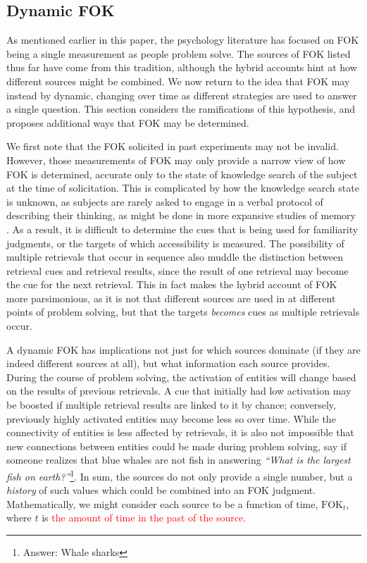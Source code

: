 \documentclass[10pt,letterpaper]{article}
\newcommand{\fixme}[2][]{#2}
\renewcommand{\fixme}[2][]{\textcolor{red}{#2}}
\newcommand{\fok}[0]{\text{FOK}}
\newcommand{\question}[2]{\emph{``#1''}\footnote{Answer: #2}}
\begin{document}


\subsection{Dynamic FOK}

As mentioned earlier in this paper, the psychology literature has focused on FOK being a single measurement as people problem solve.
The sources of FOK listed thus far have come from this tradition, although the hybrid accounts hint at how different sources might be combined. 
We now return to the idea that FOK may instead by dynamic, changing over time as different strategies are used to answer a single question.
This section considers the ramifications of this hypothesis, and proposes additional ways that FOK may be determined.

We first note that the FOK solicited in past experiments may not be invalid.
However, those measurements of FOK may only provide a narrow view of how FOK is determined, accurate only to the state of knowledge search of the subject at the time of solicitation.
This is complicated by how the knowledge search state is unknown, as subjects are rarely asked to engage in a verbal protocol of describing their thinking, as might be done in more expansive studies of memory \cite{Burgess1996ConfabulationAndThe}.
As a result, it is difficult to determine the cues that is being used for familiarity judgments, or the targets of which accessibility is measured.
The possibility of multiple retrievals that occur in sequence also muddle the distinction between retrieval cues and retrieval results, since the result of one retrieval may become the cue for the next retrieval.
This in fact makes the hybrid account of FOK more parsimonious, as it is not that different sources are used in at different points of problem solving, but that the targets \emph{becomes} cues as multiple retrievals occur.

A dynamic FOK has implications not just for which sources dominate (if they are indeed different sources at all), but what information each source provides.
During the course of problem solving, the activation of entities will change based on the results of previous retrievals.
A cue that initially had low activation may be boosted if multiple retrieval results are linked to it by chance; conversely, previously highly activated entities may become less so over time.
While the connectivity of entities is less affected by retrievals, it is also not impossible that new connections between entities could be made during problem solving, say if someone realizes that blue whales are not fish in answering \question{What is the largest fish on earth?}{Whale sharks}.
In sum, the sources do not only provide a single number, but a \emph{history} of such values which could be combined into an FOK judgment.
Mathematically, we might consider each source to be a function of time, $\fok_t$, where $t$ is \fixme{the amount of time in the past of the source.}
\end{document}
